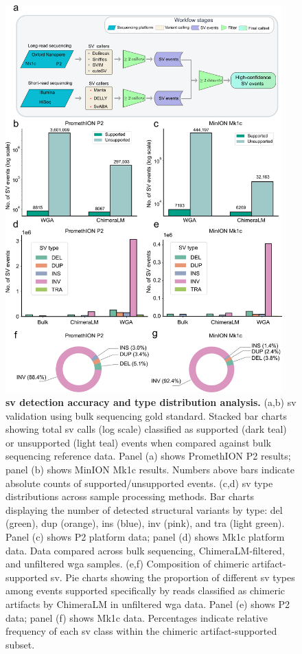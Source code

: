 \documentclass[pdflatex,sn-nature]{sn-jnl}%
\theoremstyle{thmstyleone}%
\theoremstyle{thmstyletwo}%
\theoremstyle{thmstylethree}%
\begin{document}
\begin{figure}[!ht]
	\begin{center}
		\includegraphics[width=0.95\textwidth]{final_figures/figure3}
	\end{center}
	\caption{{\bf \gls{sv} detection accuracy and type distribution analysis.}
		(a,b) \gls{sv} validation using bulk sequencing gold standard. Stacked bar charts showing total \gls{sv} calls (log scale) classified as supported (dark teal) or unsupported (light teal) events when compared against bulk sequencing reference data. Panel (a) shows PromethION P2 results; panel (b) shows MinION Mk1c results. Numbers above bars indicate absolute counts of supported/unsupported events.
		(c,d) \gls{sv} type distributions across sample processing methods. Bar charts displaying the number of detected structural variants by type: \gls{del} (green), \gls{dup} (orange), \gls{ins} (blue), \gls{inv} (pink), and \gls{tra} (light green). Panel (c) shows P2 platform data; panel (d) shows Mk1c platform data. Data compared across bulk sequencing, ChimeraLM-filtered, and unfiltered \gls{wga} samples.
		(e,f) Composition of chimeric artifact-supported \gls{sv}. Pie charts showing the proportion of different \gls{sv} types among events supported specifically by reads classified as chimeric artifacts by ChimeraLM in unfiltered \gls{wga} data. Panel (e) shows P2 data; panel (f) shows Mk1c data. Percentages indicate relative frequency of each \gls{sv} class within the chimeric artifact-supported subset.}\label{fig:figure3}
\end{figure}
\end{document}
